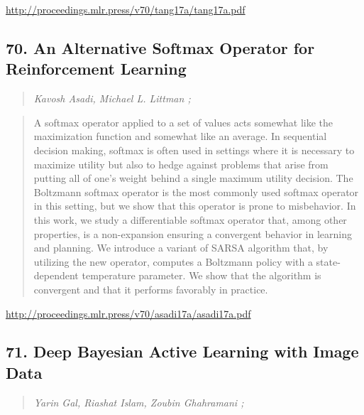 \documentclass{article}
\begin{document}
\href{http://proceedings.mlr.press/v70/tang17a/tang17a.pdf}{http://proceedings.mlr.press/v70/tang17a/tang17a.pdf}

\subsection{70. An Alternative Softmax Operator for Reinforcement Learning}

\begin{quote}
\footnotesize{\textit{Kavosh Asadi, Michael L. Littman ;}}
\end{quote}

\begin{quote}
    A softmax operator applied to a set of values acts somewhat like the maximization function and somewhat like an average. In sequential decision making, softmax is often used in settings where it is necessary to maximize utility but also to hedge against problems that arise from putting all of one’s weight behind a single maximum utility decision. The Boltzmann softmax operator is the most commonly used softmax operator in this setting, but we show that this operator is prone to misbehavior. In this work, we study a differentiable softmax operator that, among other properties, is a non-expansion ensuring a convergent behavior in learning and planning. We introduce a variant of SARSA algorithm that, by utilizing the new operator, computes a Boltzmann policy with a state-dependent temperature parameter. We show that the algorithm is convergent and that it performs favorably in practice.  \end{quote}

\href{http://proceedings.mlr.press/v70/asadi17a/asadi17a.pdf}{http://proceedings.mlr.press/v70/asadi17a/asadi17a.pdf}

\subsection{71. Deep Bayesian Active Learning with Image Data}

\begin{quote}
\footnotesize{\textit{Yarin Gal, Riashat Islam, Zoubin Ghahramani ;}}
\end{quote}
\end{document}
